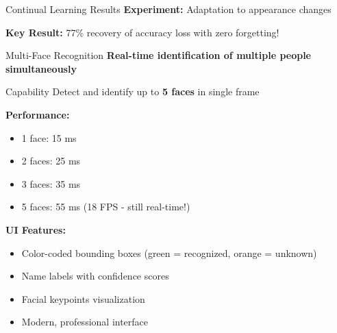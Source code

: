 \documentclass[aspectratio=169]{beamer}
\begin{document}
\begin{frame}{Continual Learning Results}
\textbf{Experiment:} Adaptation to appearance changes

\begin{center}
\end{center}

\textbf{Key Result:} 77\% recovery of accuracy loss with zero forgetting!
\end{frame}

\begin{frame}{Multi-Face Recognition}
\textbf{Real-time identification of multiple people simultaneously}

\begin{block}{Capability}
Detect and identify up to \textbf{5 faces} in single frame
\end{block}

\textbf{Performance:}
\begin{itemize}
    \item 1 face: 15 ms
    \item 2 faces: 25 ms
    \item 3 faces: 35 ms
    \item 5 faces: 55 ms (18 FPS - still real-time!)
\end{itemize}

\textbf{UI Features:}
\begin{itemize}
    \item Color-coded bounding boxes (green = recognized, orange = unknown)
    \item Name labels with confidence scores
    \item Facial keypoints visualization
    \item Modern, professional interface
\end{itemize}
\end{frame}
\end{document}
